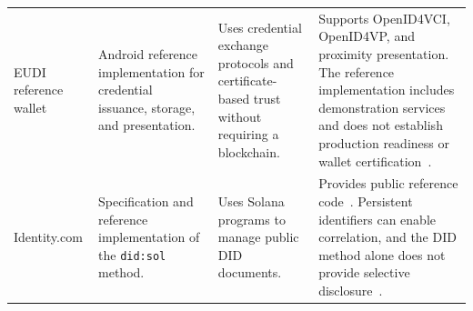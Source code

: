 \begin{table}[htbp]
\begin{tabular}{>{\raggedright\arraybackslash}m{}>{\raggedright\arraybackslash}m{}>{\raggedright\arraybackslash}m{}>{\raggedright\arraybackslash}m{}}
\addlinespace[5pt]

EUDI reference wallet &
Android reference implementation for credential issuance, storage, and presentation. &
Uses credential exchange protocols and certificate-based trust without requiring a blockchain. &
Supports OpenID4VCI, OpenID4VP, and proximity presentation. The reference implementation includes demonstration services and does not establish production readiness or wallet certification~\cite{platform-eudi-wallet-code2026}. \\

\addlinespace[5pt]

Identity.com &
Specification and reference implementation of the \texttt{did:sol} method. &
Uses Solana programs to manage public DID documents. &
Provides public reference code~\cite{platform-sol-did-code}. Persistent identifiers can enable correlation, and the DID method alone does not provide selective disclosure~\cite{platform-sol-did}. \\

\bottomrule
\end{tabular}
\end{table}

